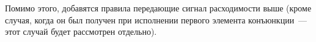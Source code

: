       
    Помимо этого, добавятся правила передающие сигнал расходимости выше (кроме случая, когда он был получен при исполнении первого элемента конъюнкции~--- этот случай будет рассмотрен отдельно). %
    
          
    
    

